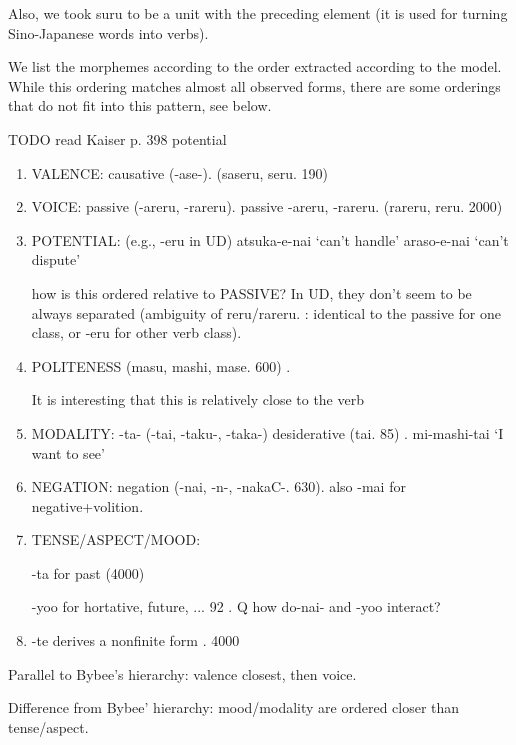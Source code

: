 \documentclass[11pt,letterpaper]{article}
\begin{document}
Also, we took suru to be a unit with the preceding element (it is used for turning Sino-Japanese words into verbs).

We list the morphemes according to the order extracted according to the model.
While this ordering matches almost all observed forms, there are some orderings that do not fit into this pattern, see below.



TODO read Kaiser p. 398 potential

\begin{enumerate}
\item VALENCE: causative (-ase-). \cite[142]{hasegawa2014japanese} \cite[Chapter 13]{kaiser2013japanese} (saseru, seru. 190)
\item VOICE: passive (-areru, -rareru). passive \cite[152]{hasegawa2014japanese} \cite[Chapter 12]{kaiser2013japanese} -areru, -rareru. (rareru, reru. 2000)
\item POTENTIAL: (e.g., -eru in UD)  atsuka-e-nai `can't handle' %
araso-e-nai `can't dispute' %

how is this ordered relative to PASSIVE? In UD, they don't seem to be always separated (ambiguity of reru/rareru. \cite[346]{vaccari1938complete}: identical to the passive for one class, or -eru for other verb class).
\item POLITENESS (masu, mashi, mase. 600) \cite[190]{kaiser2013japanese}. %

It is interesting that this is relatively close to the verb

\item MODALITY: -ta- (-tai, -taku-, -taka-) desiderative (tai. 85) \cite[238]{kaiser2013japanese}. mi-mashi-tai `I want to see'
\item NEGATION: negation (-nai, -n-, -nakaC-. 630). also -mai for negative+volition.
\item TENSE/ASPECT/MOOD:

-ta for past (4000)

-yoo for hortative, future, ... 92 \cite[229]{kaiser2013japanese}. Q how do-nai- and -yoo interact?
\item -te derives a nonfinite form \cite[186]{kaiser2013japanese}. 4000
\end{enumerate}

Parallel to Bybee's hierarchy: valence closest, then voice.

Difference from Bybee' hierarchy: mood/modality are ordered closer than tense/aspect.
\end{document}

